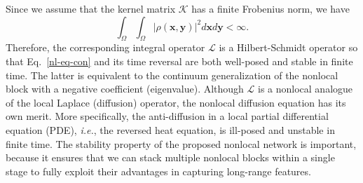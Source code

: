 \documentclass{article}
\newcommand{\xb}{\bm{x}}
\newcommand{\yb}{\bm{y}}
\begin{document}
Since we assume that the kernel matrix $\mathcal{K}$ has a finite Frobenius norm, we have
\begin{equation}
\int_\Omega\int_\Omega |\rho(\xb,\yb)|^2 d\xb d\yb <\infty.
\end{equation}
Therefore, the corresponding integral operator $\mathcal{L}$ is a Hilbert-Schmidt operator so that Eq.~\eqref{nl-eq-con} and its time reversal are both well-posed and stable in finite time. The latter is equivalent to the continuum generalization of the nonlocal block with a negative coefficient (eigenvalue). Although $\mathcal{L}$ is a nonlocal analogue of the local Laplace (diffusion) operator, the nonlocal diffusion equation has its own merit. More specifically, the anti-diffusion in a local partial differential equation (PDE), {\em i.e.}, the reversed heat equation, is ill-posed and unstable in finite time. The stability property of the proposed nonlocal network is important, because it ensures that we can stack multiple nonlocal blocks within a single stage to fully exploit their advantages in capturing long-range features.
\end{document}
